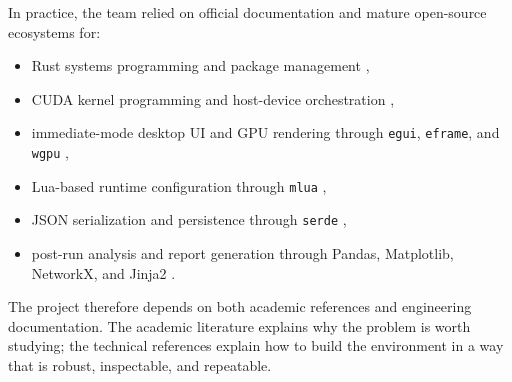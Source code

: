 In practice, the team relied on official documentation and mature open-source ecosystems for:

\begin{itemize}[nosep]
  \item Rust systems programming and package management \cite{rust},
  \item CUDA kernel programming and host-device orchestration \cite{cuda},
  \item immediate-mode desktop UI and GPU rendering through \texttt{egui}, \texttt{eframe}, and
    \texttt{wgpu} \cite{egui,wgpu},
  \item Lua-based runtime configuration through \texttt{mlua} \cite{mlua},
  \item JSON serialization and persistence through \texttt{serde} \cite{serde},
  \item post-run analysis and report generation through Pandas, Matplotlib, NetworkX, and
    Jinja2 \cite{pandas,matplotlib,networkx,jinja2}.
\end{itemize}

The project therefore depends on both academic references and engineering documentation. The
academic literature explains why the problem is worth studying; the technical references explain
how to build the environment in a way that is robust, inspectable, and repeatable.
